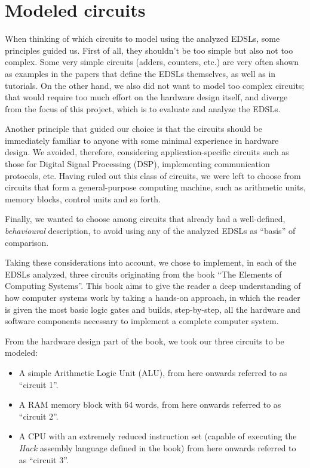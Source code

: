 \section{Modeled circuits}
\label{sec:circuits}

    When thinking of which circuits to model using the analyzed EDSLs, some principles guided us.
    First of all, they shouldn't be too simple but also not too complex. Some very simple circuits
    (adders, counters, etc.) are very often shown as examples in the papers that define the EDSLs
    themselves, as well as in tutorials. On the other hand, we also did not want to model too
    complex circuits; that would require too much effort on the hardware design itself, and diverge
    from the focus of this project, which is to evaluate and analyze the EDSLs.

    Another principle that guided our choice is that the circuits should be immediately familiar to
    anyone with some minimal experience in hardware design. We avoided, therefore, considering
    application-specific circuits such as those for Digital Signal Processing (DSP), implementing
    communication protocols, etc. Having ruled out this class of circuits, we were left to choose
    from circuits that form a general-purpose computing machine, such as arithmetic units, memory
    blocks, control units and so forth.

    Finally, we wanted to choose among circuits that already had a well-defined, \emph{behavioural}
    description, to avoid using any of the analyzed EDSLs as ``basis'' of comparison.

    Taking these considerations into account, we chose to implement, in each of the EDSLs analyzed,
    three circuits originating from the book ``The Elements of Computing
    Systems''\cite{nand2tetris-book}. This book aims to give the reader a deep understanding of how
    computer systems work by taking a hands-on approach, in which the reader is given the most basic
    logic gates and builds, step-by-step, all the hardware and software components necessary to
    implement a complete computer system.

    From the hardware design part of the book, we took our three circuits to be modeled:

    \begin{itemize}
        \item A simple Arithmetic Logic Unit (ALU), from here onwards referred to as ``circuit 1''.

        \item A RAM memory block with 64 words, from here onwards referred to as ``circuit 2''.

        \item A CPU with an extremely reduced instruction set (capable of executing the \emph{Hack}
            assembly language defined in the book) from here onwards referred to as ``circuit 3''.
    \end{itemize}

